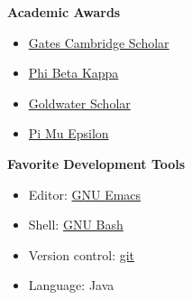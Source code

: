 \documentclass[letterpaper,11pt]{article}
\makeatletter
\newcommand{\resitem}[1]{\item #1 \vspace{-1pt}}
\newcommand{\resheading}[1]{{\large \colorbox{mygrey}{\begin{minipage}{\textwidth}{\textbf{#1 \vphantom{p\^{E}}}}\end{minipage}}}}
\newcommand{\ressubheading}[4]{
\begin{tabular*}{6.5in}{l@{\extracolsep{\fill}}r}
		\textbf{#1} & #2 \\
		\textit{#3} & \textit{#4} \\
\end{tabular*}\vspace{-6pt}}
\makeatother
\begin{document}
\resheading{\Large{Academic Awards}}
\begin{multicols}{2}
	\begin{itemize}
	\large
		\resitem{\href{http://www.gatescambridge.org/our-scholars/Profile.aspx?ScholarID=5646}{Gates Cambridge Scholar}}
		\resitem{\href{http://www.pbk.org/home/index.aspx}{Phi Beta Kappa}}
		\resitem{\href{http://www.act.org/goldwater/}{Goldwater Scholar}}
		\resitem{\href{http://www.pme-math.org/}{Pi Mu Epsilon}}

	\end{itemize}
\end{multicols}

%
%
%			
%	
%
%				
%
%								

\resheading{\Large{Favorite Development Tools}}
\begin{multicols}{2}
	\begin{itemize}
	\large
		\resitem{Editor: \href{http://www.gnu.org/software/emacs/}{GNU Emacs}}
		\resitem{Shell: \href{http://www.gnu.org/software/bash/}{GNU Bash}}
		\resitem{Version control: \href{http://git-scm.com/}{git}}
		\resitem{Language: Java}
	\end{itemize}
\end{multicols}
\end{document}

